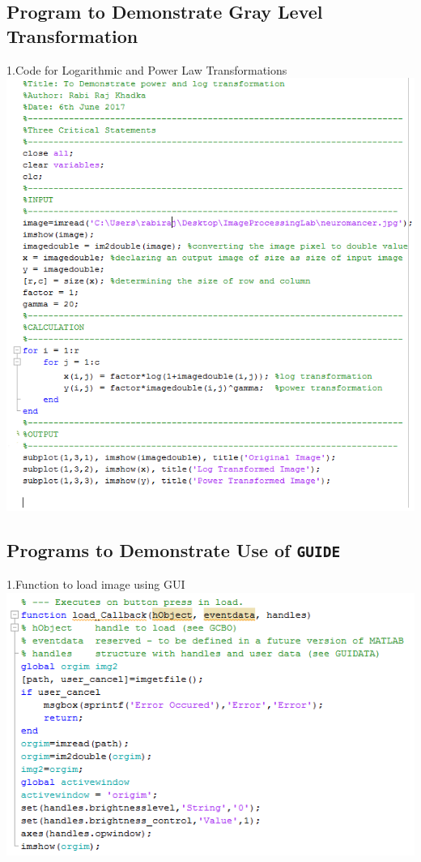 \documentclass[12pt]{article}
\begin{document}
\subsection{Program to Demonstrate Gray Level Transformation}
1.Code for Logarithmic and Power Law Transformations\\
\includegraphics[scale=1.0 ]{3CODEONE.png}

\subsection{Programs to Demonstrate Use of \texttt{GUIDE}}
1.Function to load image using GUI\\

\includegraphics[scale=0.8 ]{3CODETWO.png}
\end{document}
